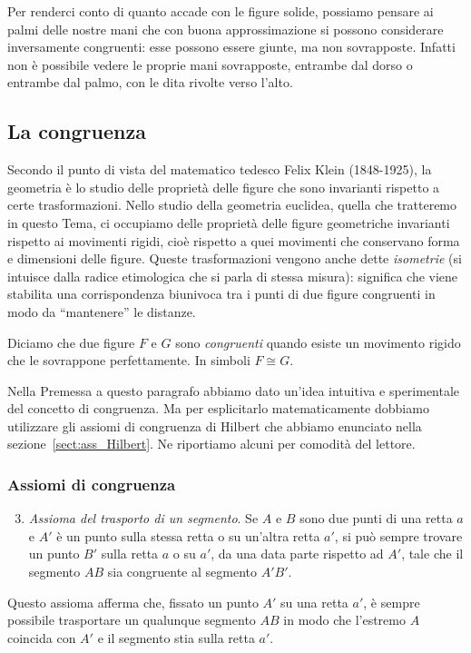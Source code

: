 Per renderci conto di quanto accade con le figure solide, possiamo pensare ai palmi delle nostre mani che con buona approssimazione si possono considerare inversamente congruenti: esse possono essere giunte, ma non sovrapposte. Infatti non è possibile vedere le proprie mani sovrapposte, entrambe dal dorso o entrambe dal palmo, con le dita rivolte verso l'alto.

\subsection{La congruenza}

Secondo il punto di vista del matematico tedesco Felix Klein (1848-1925), la geometria è lo studio delle proprietà delle figure che sono invarianti rispetto a certe trasformazioni. Nello studio della geometria euclidea, quella che tratteremo in questo Tema, ci occupiamo delle proprietà delle figure geometriche invarianti rispetto ai movimenti rigidi, cioè rispetto a quei movimenti che conservano forma e dimensioni delle figure. Queste trasformazioni vengono anche dette \emph{isometrie} (si intuisce dalla radice etimologica che si parla di stessa misura): significa che viene stabilita una corrispondenza biunivoca tra i punti di due figure congruenti in modo da ``mantenere'' le distanze.

\begin{definizione}
Diciamo che due figure $F$ e $G$ sono \emph{congruenti} quando esiste un movimento rigido che le sovrappone perfettamente. In simboli $F\cong G$.
\end{definizione}

Nella Premessa a questo paragrafo abbiamo dato un'idea intuitiva e sperimentale del concetto di congruenza. Ma per esplicitarlo matematicamente dobbiamo utilizzare gli assiomi di congruenza di Hilbert che abbiamo enunciato nella sezione~\ref{sect:ass_Hilbert}. Ne riportiamo alcuni per comodità del lettore.


\subsubsection{Assiomi di congruenza}

\begin{enumerate}[label=\Roman{*}.]
\setcounter{enumi}{2}
\item \emph{Assioma del trasporto di un segmento}. Se $A$ e $B$ sono due punti di una retta $a$ e $A'$ è un punto sulla stessa retta o su un'altra retta $a'$, si può sempre trovare un punto $B'$ sulla retta $a$ o su $a'$, da una data parte rispetto ad $A'$, tale che il segmento $AB$ sia congruente al segmento $A'B'$.
\end{enumerate}
Questo assioma afferma che, fissato un punto $A'$ su una retta $a'$, è sempre possibile trasportare un qualunque segmento $AB$ in modo che l'estremo $A$ coincida con $A'$ e il segmento stia sulla retta $a'$.

